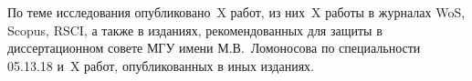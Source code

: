 {\begin{refsection}
    По теме исследования опубликовано~X работ, из них~X работы в журналах WoS, Scopus, RSCI, а также в изданиях, рекомендованных для защиты в диссертационном совете МГУ имени М.В.~Ломоносова по специальности 05.13.18 и~X работ, опубликованных в иных изданиях.
    	
        
        
    \end{refsection}%
    \begin{refsection}


\end{refsection}}
